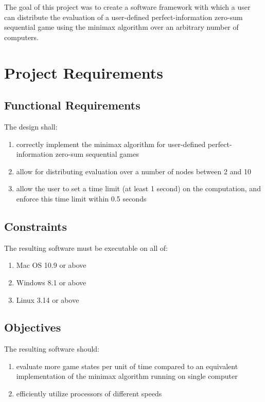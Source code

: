 \documentclass[pdftex,12pt,a4paper]{article}
\begin{document}
The goal of this project was to create a software framework with which a user can distribute the evaluation of a user-defined perfect-information zero-sum sequential game using the minimax algorithm over an arbitrary number of computers.

%
%
\section{Project Requirements}\label{sec:requirements}

\subsection{Functional Requirements}

The design shall:
\begin{enumerate}
\item correctly implement the minimax algorithm for user-defined perfect-information zero-sum sequential games
\item allow for distributing evaluation over a number of nodes between 2 and 10
\item allow the user to set a time limit (at least 1 second) on the computation, and enforce this time limit within 0.5 seconds
\end{enumerate}

\subsection{Constraints}\label{sec:constraints}

The resulting software must be executable on all of:
\begin{enumerate}
\item Mac OS 10.9 or above
\item Windows 8.1 or above
\item Linux 3.14 or above
\end{enumerate}

\subsection{Objectives}\label{sec:objectives}

The resulting software should:
\begin{enumerate}
\item evaluate more game states per unit of time compared to an equivalent implementation of the minimax algorithm running on single computer
\item\label{itm:obj-efficiency} efficiently utilize processors of different speeds
\end{enumerate}
\end{document}
